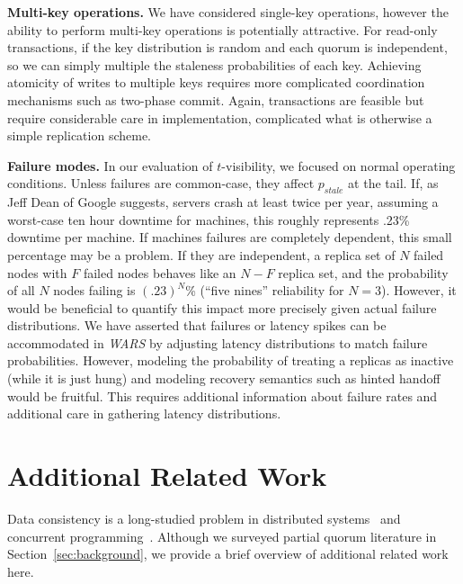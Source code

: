 \documentclass{vldb}
\begin{document}
\textbf{Multi-key operations.} We have considered single-key operations,
however the ability to perform multi-key operations is potentially
attractive.  For read-only transactions, if the key distribution is
random and each quorum is independent, so we can simply multiple the
staleness probabilities of each key.  Achieving atomicity of writes to
multiple keys requires more complicated coordination mechanisms such
as two-phase commit.  Again, transactions are feasible but require
considerable care in implementation, complicated what is otherwise a
simple replication scheme.

\textbf{Failure modes.} In our evaluation of $t$-visibility, we
focused on normal operating conditions. Unless failures are
common-case, they affect $p_{stale}$ at the tail.  If, as Jeff Dean of
Google suggests, servers crash at least twice per year, assuming a
worst-case ten hour downtime for machines, this roughly represents
.23\% downtime per machine.  If machines failures are completely
dependent, this small percentage may be a problem.  If they are
independent, a replica set of $N$ failed nodes with $F$ failed nodes
behaves like an $N-F$ replica set, and the probability of all $N$
nodes failing is $(.23)^N$\% (``five nines'' reliability for
$N$$=$$3$).  However, it would be beneficial to quantify this impact
more precisely given actual failure distributions.  We have asserted
that failures or latency spikes can be accommodated in \textit{WARS}
by adjusting latency distributions to match failure probabilities.
However, modeling the probability of treating a replicas as inactive
(while it is just hung) and modeling recovery semantics such as hinted
handoff would be fruitful.  This requires additional information about
failure rates and additional care in gathering latency distributions.

\section{Additional Related Work}
\label{sec:relatedwork}

Data consistency is a long-studied problem in distributed
systems~\cite{consistency-partitioned, danger-rep} and concurrent
programming~\cite{linearizability}.  Although we surveyed partial
quorum literature in Section~\ref{sec:background}, we provide a brief
overview of additional related work here.
\end{document}
